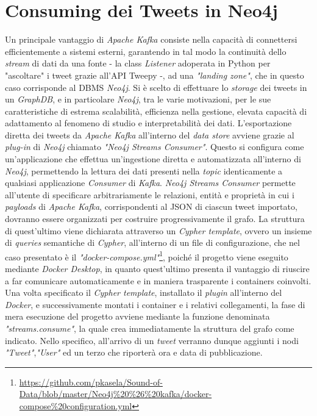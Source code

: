 \documentclass[12pt, a4paper, twocolumn]{article} %
\begin{document}
\section{Consuming dei Tweets in Neo4j}
Un principale vantaggio di \textit{Apache Kafka} consiste nella capacità di connettersi efficientemente a sistemi esterni, garantendo in tal modo la continuità dello \textit{stream} di dati da una fonte - la class \textit{Listener} adoperata in Python per "ascoltare" i tweet grazie all'API Tweepy -, ad una \textit{"landing zone"}, che in questo caso corrisponde al DBMS \textit{Neo4j}. 
Si è scelto di effettuare lo \textit{storage} dei tweets in un \textit{GraphDB}, e in particolare \textit{Neo4j}, tra le varie motivazioni, per le sue caratteristiche di estrema scalabilità, efficienza nella gestione, elevata capacità di adattamento al fenomeno di studio e interpretabilità dei dati.
L'esportazione diretta dei tweets da \textit{Apache Kafka} all'interno del \textit{data store} avviene grazie al \textit{plug-in} di \textit{Neo4j} chiamato \textit{"Neo4j Streams Consumer"}. Questo si configura come un'applicazione che effettua un'ingestione diretta e automatizzata all'interno di \textit{Neo4j}, permettendo la lettura dei dati presenti nella \textit{topic} identicamente a qualsiasi applicazione \textit{Consumer} di \textit{Kafka}. 
\textit{Neo4j Streams Consumer} permette all'utente di specificare arbitrariamente le relazioni, entità e proprietà in cui i \textit{payloads} di \textit{Apache Kafka}, corrispondenti al JSON di ciascun tweet importato, dovranno essere organizzati per costruire progressivamente il grafo.
La struttura di quest'ultimo viene dichiarata attraverso un \textit{Cypher template}, ovvero un insieme di \textit{queries} semantiche di \textit{Cypher}, all'interno di un file di configurazione, che nel caso presentato è il \textit{"docker-compose.yml"}\footnote{\url{https://github.com/pkasela/Sound-of-Data/blob/master/Neo4j\%20\%26\%20kafka/docker-compose\%20configuration.yml}}, poiché il progetto viene eseguito mediante \textit{Docker Desktop}, in quanto quest'ultimo presenta il vantaggio di riuscire a far comunicare automaticamente e in maniera trasparente i containers coinvolti. 
Una volta specificato il \textit{Cypher template}, installato il \textit{plugin} all'interno del \textit{Docker}, e successivamente montati i container e i relativi collegamenti, la fase di mera esecuzione del progetto avviene mediante la funzione denominata \textit{"streams.consume"}, la quale crea immediatamente la struttura del grafo come indicato. 
Nello specifico, all'arrivo di un \textit{tweet} verranno dunque aggiunti i nodi \textit{"Tweet"},\textit{"User"} ed un terzo che riporterà ora e data di pubblicazione. 
\end{document}
